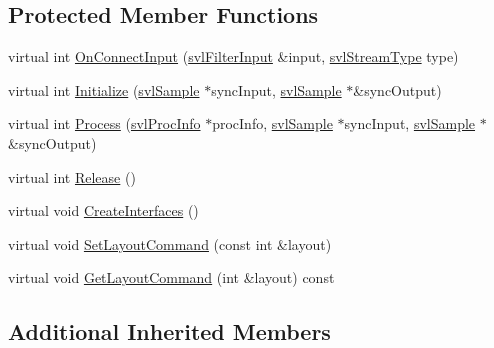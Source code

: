 \subsection*{Protected Member Functions}
\begin{DoxyCompactItemize}
\item 
virtual int \hyperlink{classsvl_filter_stereo_image_joiner_a07fe73ef7791be2fa14d830af1486106}{On\-Connect\-Input} (\hyperlink{classsvl_filter_input}{svl\-Filter\-Input} \&input, \hyperlink{svl_definitions_8h_aa00696d338a58db361335a01fd11e122}{svl\-Stream\-Type} type)
\item 
virtual int \hyperlink{classsvl_filter_stereo_image_joiner_adf15090abfb5e330f0e7694c79cefa33}{Initialize} (\hyperlink{classsvl_sample}{svl\-Sample} $\ast$sync\-Input, \hyperlink{classsvl_sample}{svl\-Sample} $\ast$\&sync\-Output)
\item 
virtual int \hyperlink{classsvl_filter_stereo_image_joiner_af8fa25f725e5f90e71df4b54fd584b55}{Process} (\hyperlink{structsvl_proc_info}{svl\-Proc\-Info} $\ast$proc\-Info, \hyperlink{classsvl_sample}{svl\-Sample} $\ast$sync\-Input, \hyperlink{classsvl_sample}{svl\-Sample} $\ast$\&sync\-Output)
\item 
virtual int \hyperlink{classsvl_filter_stereo_image_joiner_a3b66546391f6866904cb328c3034d041}{Release} ()
\item 
virtual void \hyperlink{classsvl_filter_stereo_image_joiner_afed4e6bca724f7f61cc81a83b9c74160}{Create\-Interfaces} ()
\item 
virtual void \hyperlink{classsvl_filter_stereo_image_joiner_a21f7419df96a7335fcb99831fe163895}{Set\-Layout\-Command} (const int \&layout)
\item 
virtual void \hyperlink{classsvl_filter_stereo_image_joiner_aada6526253852cf7dd60ec592d932c2c}{Get\-Layout\-Command} (int \&layout) const 
\end{DoxyCompactItemize}
\subsection*{Additional Inherited Members}


